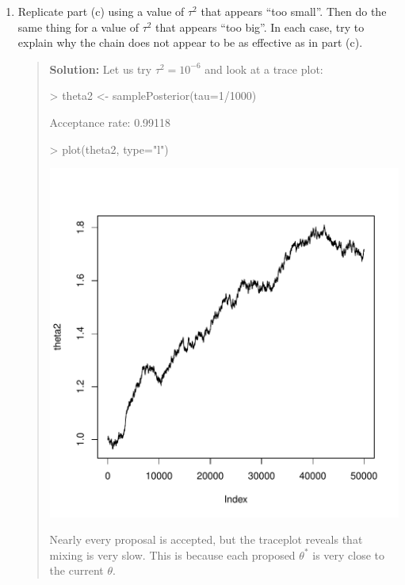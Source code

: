 \documentclass{article}
\begin{document}
\begin{enumerate}
\begin{enumerate}
      \item Replicate part (c) using a value of $\tau^2$ that appears ``too
      small''. Then do the same thing for a value of $\tau^2$ that appears ``too
      big''. In each case, try to explain why the chain does not appear to be as
      effective as in part (c).
      \begin{quotation}{\bf Solution:}
      Let us try $\tau^2=10^{-6}$ and look at a trace plot:
\begin{Schunk}
\begin{Sinput}
> theta2 <- samplePosterior(tau=1/1000)
\end{Sinput}
\begin{Soutput}
Acceptance rate:  0.99118
\end{Soutput}
\begin{Sinput}
> plot(theta2, type="l")
\end{Sinput}
\end{Schunk}
\includegraphics{sol11-005}
      
      Nearly every proposal is accepted, but the traceplot reveals that mixing is very slow.  
      This is because each proposed $\theta^*$ is very close to the current $\theta$.
      

\end{quotation}
\end{enumerate}
\end{enumerate}
\end{document}
